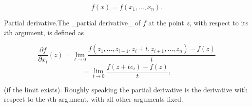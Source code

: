 \[f(x)=f(x_{1},\ldots,x_{n}).\]

Partial derivative.The _partial derivative_ of \(f\) at the point \(z\), with respect to its \(i\)th argument, is defined as

\[\frac{\partial f}{\partial x_{i}}(z) = \lim_{t\to 0}\frac{f(z_{1},\ldots,z_{i-1},z_{i}+t,z_{i+1}, \ldots,z_{n})-f(z)}{t}\] \[= \lim_{t\to 0}\frac{f(z+te_{i})-f(z)}{t},\]

(if the limit exists). Roughly speaking the partial derivative is the derivative with respect to the \(i\)th argument, with all other arguments fixed.

 